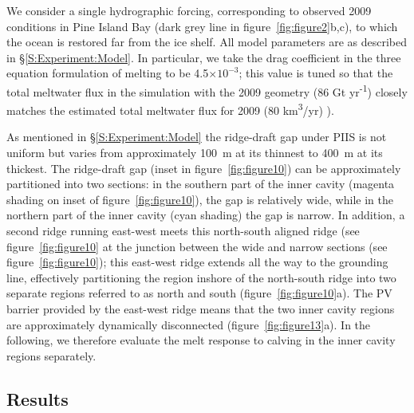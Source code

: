 \documentclass[draft]{agujournal2019}
\begin{document}
We consider a single hydrographic forcing, corresponding to observed 2009 conditions in Pine Island Bay (dark grey line in figure~\ref{fig:figure2}b,c), to which the ocean is restored far from the ice shelf. All model parameters are as described in \S\ref{S:Experiment:Model}. In particular, we take the drag coefficient in the three equation formulation of melting to be 4.5$\times10^{-3}$; this value is tuned so that the total meltwater flux in the simulation with the 2009 geometry (86 Gt yr\textsuperscript{-1}) closely matches the estimated total meltwater flux for 2009 (80 km\textsuperscript{3}/yr) \cite{Dutrieux2014Science}). %

As mentioned in \S\ref{S:Experiment:Model} the ridge-draft gap under PIIS is not uniform but varies from approximately 100~m at its thinnest to 400~m at its thickest.  The ridge-draft gap (inset in figure~\ref{fig:figure10}) can be approximately partitioned into two sections: in the southern part of the inner cavity (magenta shading on inset of figure~\ref{fig:figure10}), the gap is relatively wide, while in the northern part of the inner cavity (cyan shading) the gap is narrow. In addition, a second ridge running east-west meets this north-south aligned ridge (see figure~\ref{fig:figure10} at the junction between the wide and narrow sections (see figure~\ref{fig:figure10}); this east-west ridge extends all the way to the grounding line, effectively partitioning the region inshore of the north-south ridge into two separate regions referred to as north and south (figure~\ref{fig:figure10}a). The PV barrier provided by the east-west ridge means that the two inner cavity regions are approximately dynamically disconnected (figure~\ref{fig:figure13}a). In the following, we therefore evaluate the melt response to calving in the inner cavity regions separately.

\subsection{Results}
\end{document}
